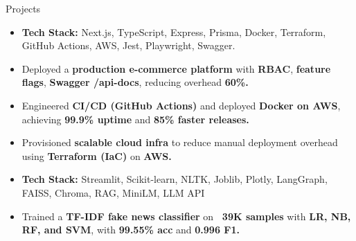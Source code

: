 \documentclass{resume}
\begin{document}
\begin{experienceSection}{Projects}
\projectItem[
    title={ShopSmart \ {\small
    \faGithub \hspace{1mm} \href{https://github.com/Taj-2005/shop_smart}{Code} \hspace{3mm}
    \faGlobe \hspace{1mm} \href{https://shopsmart.taj.works/}{Live Project}}},
    duration={DevOps}
]
\begin{itemize}\small
\vspace{-0.7em}
\itemsep -5pt

\item \textbf{Tech Stack:} Next.js, TypeScript, Express, Prisma, Docker, Terraform, GitHub Actions, AWS, Jest, Playwright, Swagger.

\item Deployed a \textbf{production e-commerce platform} with \textbf{RBAC}, \textbf{feature flags}, \textbf{Swagger /api-docs}, reducing overhead \textbf{60\%.}

\item Engineered \textbf{CI/CD (GitHub Actions)} and deployed \textbf{Docker on AWS}, achieving \textbf{99.9\% uptime} and \textbf{85\% faster releases.}

\item Provisioned \textbf{scalable cloud infra} to reduce manual deployment overhead using \textbf{Terraform (IaC)} on \textbf{AWS.}

\end{itemize}

\projectItem[
    title={CrediScope AI \ {\small
    \faGithub \hspace{1mm} \href{https://github.com/Taj-2005/news_creditability_analysis}{Code} \hspace{3mm}
    \faGlobe \hspace{1mm} \href{https://news-creditability.streamlit.app/}{Live Project}}},
    duration={AI ML}
]
\begin{itemize}\small
\vspace{-0.7em}
\itemsep -5pt

\item \textbf{Tech Stack:} Streamlit, Scikit-learn, NLTK, Joblib, Plotly, LangGraph, FAISS, Chroma, RAG, MiniLM, LLM API

\item Trained a \textbf{TF-IDF fake news classifier} on \textbf{~39K samples} with \textbf{LR, NB, RF, and SVM}, with \textbf{99.55\% acc} and \textbf{0.996 F1.}


\end{itemize}
\end{experienceSection}
\end{document}
